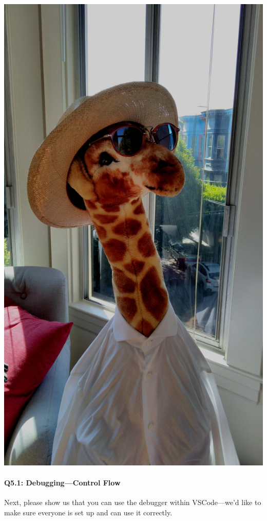 \documentclass[11pt]{article}
\begin{document}
\includegraphics[scale=0.1]{modified_gigi.jpg}




\pagebreak
\paragraph{Q5.1: Debugging---Control Flow} Next, please show us that you can use the debugger within VSCode---we'd like to make sure everyone is set up and can use it correctly. 
\end{document}
